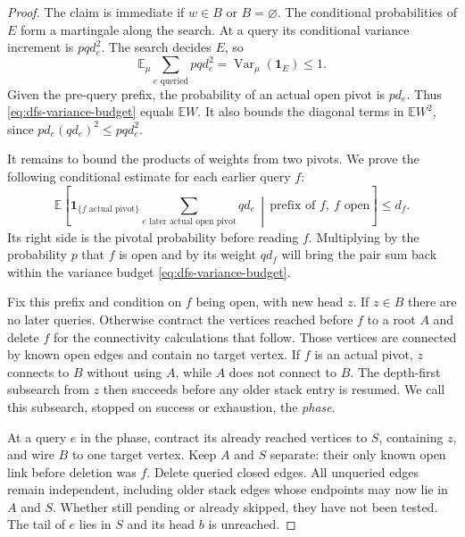 \documentclass[11pt]{article}
\theoremstyle{definition}
\begin{document}
\begin{proof}
The claim is immediate if $w\in B$ or $B=\varnothing$.
The conditional probabilities of $E$ form a martingale along the
search. At a query its conditional variance increment is $pq d_e^2$.
The search decides $E$, so
\begin{equation}\label{eq:dfs-variance-budget}
 \mathbb E_\mu\sum_{e\text{ queried}}pq d_e^2
 =\operatorname{Var}_\mu(\mathbf1_E)\le1.
\end{equation}
Given the pre-query prefix, the probability of an actual open pivot is
$p d_e$. Thus \eqref{eq:dfs-variance-budget} equals $\mathbb E W$.
It also bounds the diagonal terms in $\mathbb E W^2$, since
$p d_e(qd_e)^2\le pq d_e^2$.

It remains to bound the products of weights from two pivots. We prove
the following conditional estimate for each earlier query $f$:
\begin{equation}\label{eq:dfs-future-pair-bound}
 \mathbb E\left[
 \mathbf1_{\{f\text{ actual pivot}\}}
 \sum_{e\text{ later actual open pivot}}q d_e
 \,\middle|\,\text{prefix of }f,\ f\text{ open}\right]\le d_f.
\end{equation}
Its right side is the pivotal probability before reading $f$.
Multiplying by the probability $p$ that $f$ is open and by its weight
$qd_f$ will bring the pair sum back within the variance budget
\eqref{eq:dfs-variance-budget}.

Fix this prefix and condition on $f$ being open, with new head $z$.
If $z\in B$ there are no later queries. Otherwise contract the vertices
reached before $f$ to a root $A$ and delete $f$ for the connectivity
calculations that follow. Those vertices are connected by known open
edges and contain no target vertex. If $f$ is an actual pivot, $z$
connects to $B$ without using $A$, while $A$ does not connect to $B$.
The depth-first subsearch from $z$ then succeeds before any older stack
entry is resumed. We call this subsearch, stopped on success or
exhaustion, the \emph{phase}.

At a query $e$ in the phase, contract its already reached vertices to
$S$, containing $z$, and wire $B$ to one target vertex. Keep $A$ and
$S$ separate: their only known open link before deletion was $f$.
Delete queried closed edges. All unqueried edges remain independent,
including older stack edges whose endpoints may now lie in $A$ and
$S$. Whether still pending or already skipped, they have not been tested.
The tail of $e$ lies
in $S$ and its head $b$ is unreached.


\end{proof}
\end{document}
